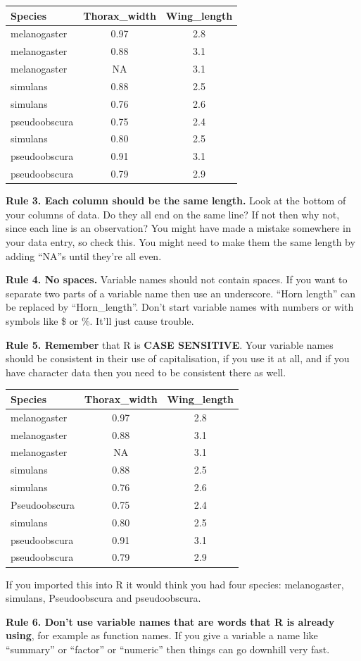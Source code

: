 \documentclass[
]{book}
\begin{document}
\begin{longtable}[]{@{}lcc@{}}
\toprule
Species & Thorax\_width & Wing\_length\tabularnewline
\midrule
\endhead
melanogaster & 0.97 & 2.8\tabularnewline
melanogaster & 0.88 & 3.1\tabularnewline
melanogaster & NA & 3.1\tabularnewline
simulans & 0.88 & 2.5\tabularnewline
simulans & 0.76 & 2.6\tabularnewline
pseudoobscura & 0.75 & 2.4\tabularnewline
simulans & 0.80 & 2.5\tabularnewline
pseudoobscura & 0.91 & 3.1\tabularnewline
pseudoobscura & 0.79 & 2.9\tabularnewline
\bottomrule
\end{longtable}

\textbf{Rule 3. Each column should be the same length.} Look at the bottom of your columns of data. Do they all end on the same line? If not then why not, since each line is an observation? You might have made a mistake somewhere in your data entry, so check this. You might need to make them the same length by adding ``NA''s until they're all even.

\textbf{Rule 4. No spaces.} Variable names should not contain spaces. If you want to separate two parts of a variable name then use an underscore. ``Horn length'' can be replaced by ``Horn\_length''. Don't start variable names with numbers or with symbols like \$ or \%. It'll just cause trouble.

\textbf{Rule 5. Remember} that R is \textbf{CASE SENSITIVE}. Your variable names should be consistent in their use of capitalisation, if you use it at all, and if you have character data then you need to be consistent there as well.

\begin{longtable}[]{@{}lcc@{}}
\toprule
Species & Thorax\_width & Wing\_length\tabularnewline
\midrule
\endhead
melanogaster & 0.97 & 2.8\tabularnewline
melanogaster & 0.88 & 3.1\tabularnewline
melanogaster & NA & 3.1\tabularnewline
simulans & 0.88 & 2.5\tabularnewline
simulans & 0.76 & 2.6\tabularnewline
Pseudoobscura & 0.75 & 2.4\tabularnewline
simulans & 0.80 & 2.5\tabularnewline
pseudoobscura & 0.91 & 3.1\tabularnewline
pseudoobscura & 0.79 & 2.9\tabularnewline
\bottomrule
\end{longtable}

If you imported this into R it would think you had four species: melanogaster, simulans, Pseudoobscura and pseudoobscura.

\textbf{Rule 6. Don't use variable names that are words that R is already using}, for example as function names. If you give a variable a name like ``summary'' or ``factor'' or ``numeric'' then things can go downhill very fast.
\end{document}

